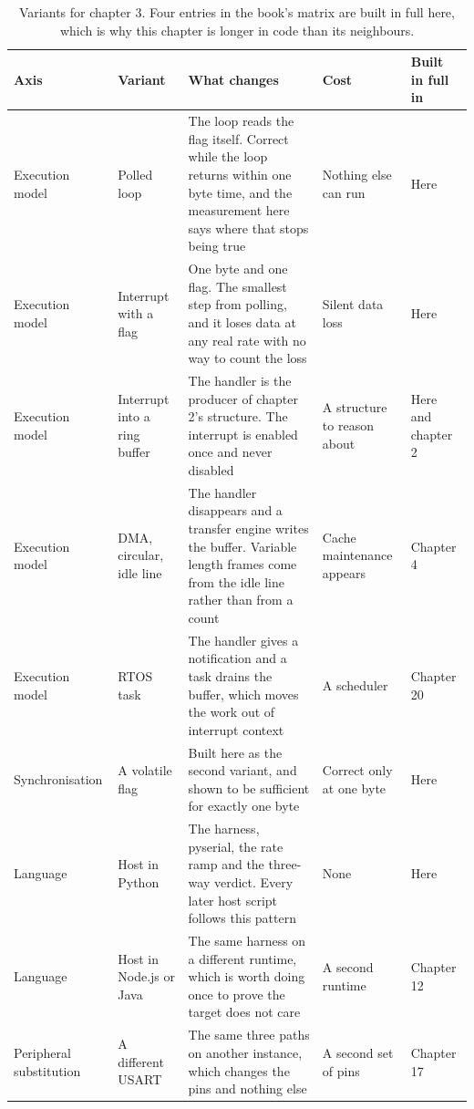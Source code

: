 \begin{table}[H]\centering\small
\begin{tabular}{p{24mm}p{26mm}p{44mm}p{22mm}p{20mm}}
\toprule
Axis & Variant & What changes & Cost & Built in full in \\
\midrule
Execution model & Polled loop & The loop reads the flag itself. Correct while the loop returns within one byte time, and the measurement here says where that stops being true & Nothing else can run & Here \\
Execution model & Interrupt with a flag & One byte and one flag. The smallest step from polling, and it loses data at any real rate with no way to count the loss & Silent data loss & Here \\
Execution model & Interrupt into a ring buffer & The handler is the producer of chapter 2's structure. The interrupt is enabled once and never disabled & A structure to reason about & Here and chapter 2 \\
Execution model & DMA, circular, idle line & The handler disappears and a transfer engine writes the buffer. Variable length frames come from the idle line rather than from a count & Cache maintenance appears & Chapter 4 \\
Execution model & RTOS task & The handler gives a notification and a task drains the buffer, which moves the work out of interrupt context & A scheduler & Chapter 20 \\
Synchronisation & A volatile flag & Built here as the second variant, and shown to be sufficient for exactly one byte & Correct only at one byte & Here \\
Language & Host in Python & The harness, pyserial, the rate ramp and the three-way verdict. Every later host script follows this pattern & None & Here \\
Language & Host in Node.js or Java & The same harness on a different runtime, which is worth doing once to prove the target does not care & A second runtime & Chapter 12 \\
Peripheral substitution & A different USART & The same three paths on another instance, which changes the pins and nothing else & A second set of pins & Chapter 17 \\
\bottomrule
\end{tabular}
\caption{Variants for chapter 3. Four entries in the book's matrix are built in full here, which is why this chapter is longer in code than its neighbours.}
\end{table}

